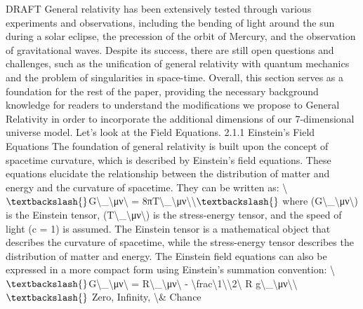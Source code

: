 \documentclass[12pt]{article}
\begin{document}
DRAFT
General relativity has been extensively tested through various experiments and observations,
including the bending of light around the sun during a solar eclipse, the precession of the orbit of
Mercury, and the observation of gravitational waves. Despite its success, there are still open
questions and challenges, such as the unification of general relativity with quantum mechanics
and the problem of singularities in space-time.
Overall, this section serves as a foundation for the rest of the paper, providing the necessary
background knowledge for readers to understand the modifications we propose to General
Relativity in order to incorporate the additional dimensions of our 7-dimensional universe model.
Let’s look at the Field Equations.
2.1.1 Einstein’s Field Equations
The foundation of general relativity is built upon the concept of spacetime curvature,
which is described by Einstein's ﬁeld equations. These equations elucidate the
relationship between the distribution of matter and energy and the curvature of
spacetime. They can be written as:
\textbackslash{}$\textbackslash{}$G\textbackslash{}_\textbackslash{}{μν\textbackslash{}} = 8πT\textbackslash{}_\textbackslash{}{μν\textbackslash{}}\textbackslash{}$\textbackslash{}$
where (G\textbackslash{}_\textbackslash{}{μν\textbackslash{}}) is the Einstein tensor, (T\textbackslash{}_\textbackslash{}{μν\textbackslash{}}) is the stress-energy tensor, and the
speed of light (c = 1) is assumed. The Einstein tensor is a mathematical object that
describes the curvature of spacetime, while the stress-energy tensor describes the
distribution of matter and energy.
The Einstein ﬁeld equations can also be expressed in a more compact form using
Einstein's summation convention:
\textbackslash{}$\textbackslash{}$G\textbackslash{}_\textbackslash{}{μν\textbackslash{}} = R\textbackslash{}_\textbackslash{}{μν\textbackslash{}} - \textbackslash{}frac\textbackslash{}{1\textbackslash{}}\textbackslash{}{2\textbackslash{}} R g\textbackslash{}_\textbackslash{}{μν\textbackslash{}}\textbackslash{}$\textbackslash{}$
Zero, Infinity, \textbackslash{}& Chance
\end{document}
